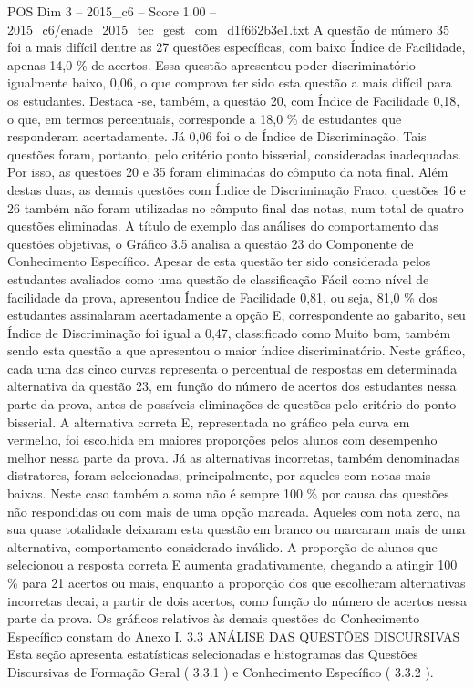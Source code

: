 \begin{textsample}{POS Dim 3 – 2015\_c6 – Score 1.00 – 2015\_c6/enade\_2015\_tec\_gest\_com\_d1f662b3e1.txt}
A questão de número 35 foi a mais difícil dentre as 27 questões específicas, com baixo Índice de Facilidade, apenas 14,0 \% de acertos.
Essa questão apresentou poder discriminatório igualmente baixo, 0,06, o que comprova ter sido esta questão a mais difícil para os estudantes.
Destaca -se, também, a questão 20, com Índice de Facilidade 0,18, o que, em termos percentuais, corresponde a 18,0 \% de estudantes que responderam acertadamente.
Já 0,06 foi o de Índice de Discriminação.
Tais questões foram, portanto, pelo critério ponto bisserial, consideradas inadequadas.
Por isso, as questões 20 e 35 foram eliminadas do cômputo da nota final.
Além destas duas, as demais questões com Índice de Discriminação Fraco, questões 16 e 26 também não foram utilizadas no cômputo final das notas, num total de quatro questões eliminadas.
A título de exemplo das análises do comportamento das questões objetivas, o Gráfico 3.5 analisa a questão 23 do Componente de Conhecimento Específico.
Apesar de esta questão ter sido considerada pelos estudantes avaliados como uma questão de classificação Fácil como nível de facilidade da prova, apresentou Índice de Facilidade 0,81, ou seja, 81,0 \% dos estudantes assinalaram acertadamente a opção E, correspondente ao gabarito, seu Índice de Discriminação foi igual a 0,47, classificado como Muito bom, também sendo esta questão a que apresentou o maior índice discriminatório.
Neste gráfico, cada uma das cinco curvas representa o percentual de respostas em determinada alternativa da questão 23, em função do número de acertos dos estudantes nessa parte da prova, antes de possíveis eliminações de questões pelo critério do ponto bisserial.
A alternativa correta E, representada no gráfico pela curva em vermelho, foi escolhida em maiores proporções pelos alunos com desempenho melhor nessa parte da prova.
Já as alternativas incorretas, também denominadas distratores, foram selecionadas, principalmente, por aqueles com notas mais baixas.
Neste caso também a soma não é sempre 100 \% por causa das questões não respondidas ou com mais de uma opção marcada.
Aqueles com nota zero, na sua quase totalidade deixaram esta questão em branco ou marcaram mais de uma alternativa, comportamento considerado inválido.
A proporção de alunos que selecionou a resposta correta E aumenta gradativamente, chegando a atingir 100 \% para 21 acertos ou mais, enquanto a proporção dos que escolheram alternativas incorretas decai, a partir de dois acertos, como função do número de acertos nessa parte da prova.
Os gráficos relativos às demais questões do Conhecimento Específico constam do Anexo I. 3.3 ANÁLISE DAS QUESTÕES DISCURSIVAS Esta seção apresenta estatísticas selecionadas e histogramas das Questões Discursivas de Formação Geral ( 3.3.1 ) e Conhecimento Específico ( 3.3.2 ).

\end{textsample}
